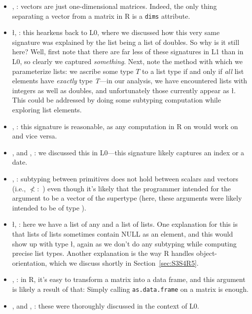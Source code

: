 \documentclass[acmsmall,10pt,review,anonymous]{acmart}\settopmatter{printfolios=true,printccs=false,printacmref=false}
\newcommand{\code}[1]{\lstinline|#1|\xspace}
\begin{document}
\begin{itemize}
	\item \D, : vectors are just one-dimensional matrices.
	Indeed, the only thing separating a vector from a matrix in R is a {\tt dims} attribute.
	
	\item \l, : this hearkens back to L0, where we discussed how this very same signature was explained by the list being a list of doubles.
	So why is it still here?
	Well, first note that there are far less of these signatures in L1 than in L0, so clearly we captured {\it something}.
	Next, note the method with which we parameterize lists: we ascribe some type $T$ to a list type  if and only if {\it all} list elements have {\it exactly} type {\it T}---in our analysis, we have encountered lists with integers as well as doubles, and unfortunately those currently appear as \l.
	This could be addressed by doing some subtyping computation while exploring list elements.
	
	\item {}, : this signature is reasonable, as any computation in R on  would work on  and vice versa.
	
	\item \sC, \sD and \C, \D: we discussed this in L0---this signature likely captures an index or a date.
	
	\item \I, \sD: subtyping between primitives does not hold between scalars and vectors (i.e., \I $\not<:$ \sD) even though it's likely that the programmer intended for the argument to be a vector of the supertype (here, these arguments were likely intended to be of type \D).

	\item \l, : here we have a list of any and a list of lists.
	One explanation for this is that lists of lists sometimes contain NULL as an element, and this would show up with type \l, again as we don't do any subtyping while computing precise list types.
	Another explanation is the way R handles object-orientation, which we discuss shortly in Section~\ref{sec:S3S4R5}.
	
	\item \df, : in R, it's easy to transform a matrix into a data frame, and this argument is likely a result of that:
	Simply calling \code{as.data.frame} on a matrix is enough.
	
	\item \sD, \sF and \sC, \sF: these were thoroughly discussed in the context of L0.
	
\end{itemize}
\end{document}
